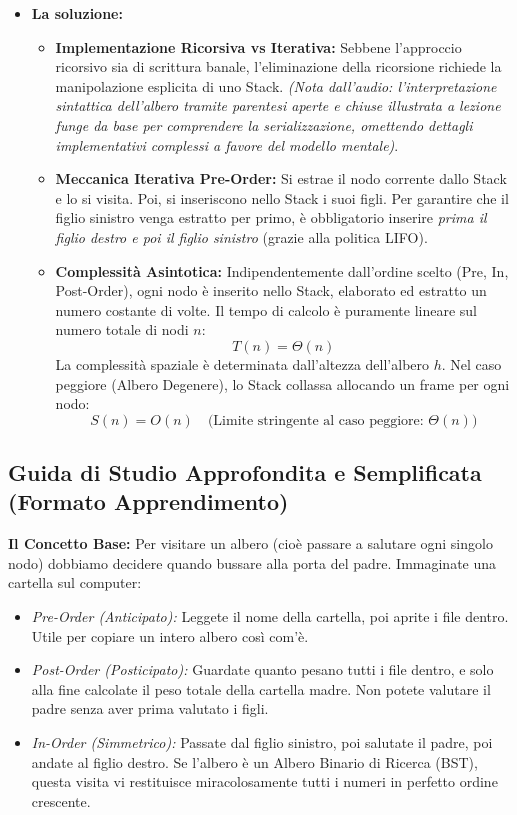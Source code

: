 \documentclass[a4paper, 11pt]{report}
\begin{document}
\begin{itemize}
\item \textbf{La soluzione:}
\begin{itemize}
    \item \textbf{Implementazione Ricorsiva vs Iterativa:} Sebbene l'approccio ricorsivo sia di scrittura banale, l'eliminazione della ricorsione richiede la manipolazione esplicita di uno Stack. \textit{(Nota dall'audio: l'interpretazione sintattica dell'albero tramite parentesi aperte e chiuse illustrata a lezione funge da base per comprendere la serializzazione, omettendo dettagli implementativi complessi a favore del modello mentale)}.
    \item \textbf{Meccanica Iterativa Pre-Order:} Si estrae il nodo corrente dallo Stack e lo si visita. Poi, si inseriscono nello Stack i suoi figli. Per garantire che il figlio sinistro venga estratto per primo, è obbligatorio inserire \textit{prima il figlio destro e poi il figlio sinistro} (grazie alla politica LIFO).
    \item \textbf{Complessità Asintotica:} Indipendentemente dall'ordine scelto (Pre, In, Post-Order), ogni nodo è inserito nello Stack, elaborato ed estratto un numero costante di volte.
    Il tempo di calcolo è puramente lineare sul numero totale di nodi $n$:
    \[ T(n) = \Theta(n) \]
    La complessità spaziale è determinata dall'altezza dell'albero $h$. Nel caso peggiore (Albero Degenere), lo Stack collassa allocando un frame per ogni nodo:
    \begin{equation*}
    S(n) = O(n) \quad \text{(Limite stringente al caso peggiore: } \Theta(n)\text{)}
    \end{equation*}
\end{itemize}
\end{itemize}

\vspace{0.5cm}
\subsection*{Guida di Studio Approfondita e Semplificata (Formato Apprendimento)}


\textbf{Il Concetto Base:}
Per visitare un albero (cioè passare a salutare ogni singolo nodo) dobbiamo decidere quando bussare alla porta del padre.
Immaginate una cartella sul computer:
\begin{itemize}
\item \textit{Pre-Order (Anticipato):} Leggete il nome della cartella, poi aprite i file dentro. Utile per copiare un intero albero così com'è.
\item \textit{Post-Order (Posticipato):} Guardate quanto pesano tutti i file dentro, e solo alla fine calcolate il peso totale della cartella madre. Non potete valutare il padre senza aver prima valutato i figli.
\item \textit{In-Order (Simmetrico):} Passate dal figlio sinistro, poi salutate il padre, poi andate al figlio destro. Se l'albero è un Albero Binario di Ricerca (BST), questa visita vi restituisce miracolosamente tutti i numeri in perfetto ordine crescente.
\end{itemize}
\end{document}
